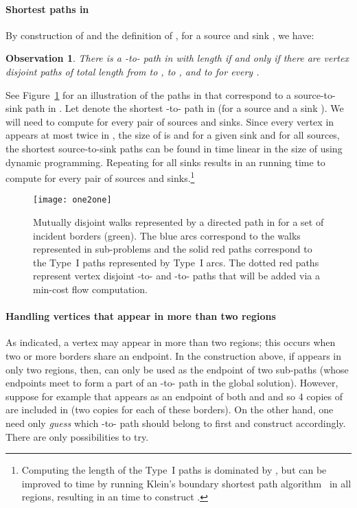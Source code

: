 \documentclass[11pt,twoside]{article}
\newtheorem{observation}[theorem]{Observation}
\begin{document}
\paragraph{Shortest paths in }
By construction of  and the definition of , for a source  and sink , we have:
\begin{observation}
  There is a -to- path in  with length  if and only if there are vertex disjoint paths of total length  from  to ,  to , and  to  for every .
\end{observation}
See Figure~\ref{fig:one-to-one} for an illustration of the paths in  that correspond to a source-to-sink path in . Let  denote the shortest -to- path in  (for a source  and a sink ).  We will need to compute  for every pair of sources and sinks.  Since every vertex in  appears at most twice in , the size of  is  and for a given sink and for all sources, the shortest source-to-sink paths can be found in time linear in the size of  using dynamic programming.  Repeating for all sinks results in an  running time to compute  for every pair of sources and sinks.\footnote{Computing the length of the Type~I paths is dominated by , but can be improved to  time by running Klein's boundary shortest path algorithm~\cite{klein2005multiSourceShPaths} in all regions, resulting in an  time to construct .}

\begin{figure}[ht]
  \centering
  \texttt{[image: one2one]}
  \caption{Mutually disjoint walks represented by a directed path in  for a set of incident borders (green).  The blue arcs correspond to the walks represented in sub-problems and the solid red paths correspond to the Type~I paths represented by Type~I arcs.  The dotted red paths represent vertex disjoint -to- and -to- paths that will be added via a min-cost flow computation.}
\label{fig:one-to-one}
\end{figure}


\paragraph{Handling vertices that appear in more than two regions}  As indicated, a vertex  may appear in more than two regions; this occurs when two or more borders share an endpoint.  In the construction above, if  appears in only two regions, then,  can only be used as the endpoint of two sub-paths (whose endpoints meet to form a part of an -to- path in the global solution).  However, suppose for example that  appears as an endpoint of both  and  and so 4 copies of  are included in  (two copies for each of these borders).  On the other hand, one need only {\em guess} which -to- path  should belong to first and construct  accordingly.  There are only  possibilities to try.
\end{document}
